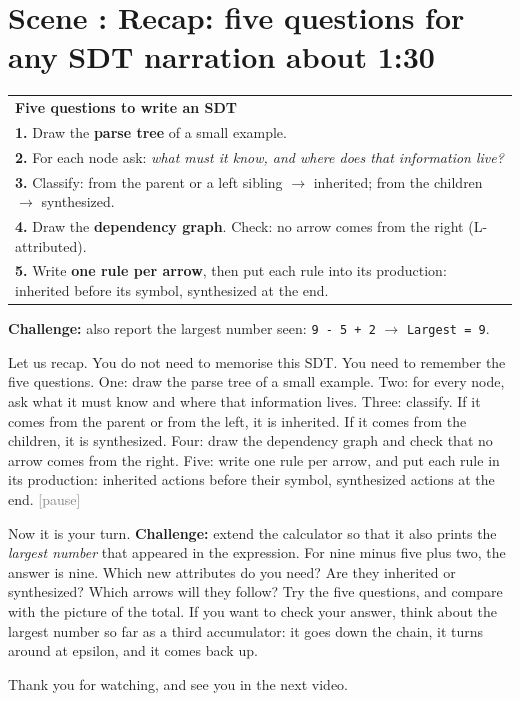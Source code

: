 \documentclass[11pt,a4paper]{article}
\newcommand{\inh}[1]{\textcolor{blue!70!black}{#1}}   %
\newcommand{\syn}[1]{\textcolor{red!70!black}{#1}}    %
\newcommand{\pause}{\textcolor{gray}{\textsf{[pause]}}}
\newcounter{scene}
\newcommand{\scene}[2]{\stepcounter{scene}\needspace{20\baselineskip}\section*{Scene \thescene: #1 \hfill {\normalfont\small #2}}}
\begin{document}
\scene{Recap: five questions for any SDT}{narration about 1:30}

\begin{onscreen}
\begin{center}
\begin{tabular}{|p{12.8cm}|}
\hline
\textbf{Five questions to write an SDT}\\[2pt]
\textbf{1.} Draw the \textbf{parse tree} of a small example.\\
\textbf{2.} For each node ask: \emph{what must it know, and where does that information live?}\\
\textbf{3.} Classify: from the parent or a left sibling $\to$ \inh{inherited}; from the children $\to$ \syn{synthesized}.\\
\textbf{4.} Draw the \textbf{dependency graph}. Check: no arrow comes from the right (L-attributed).\\
\textbf{5.} Write \textbf{one rule per arrow}, then put each rule into its production: \inh{inherited} before its symbol, \syn{synthesized} at the end.\\ \hline
\end{tabular}
\end{center}
\textbf{Challenge:} also report the largest number seen: \texttt{9 - 5 + 2} $\to$ \texttt{Largest = 9}.
\end{onscreen}

\begin{narration}
Let us recap. You do not need to memorise this SDT. You need to remember the five questions. One: draw the parse tree of a small example. Two: for every node, ask what it must know and where that information lives. Three: classify. If it comes from the parent or from the left, it is inherited. If it comes from the children, it is synthesized. Four: draw the dependency graph and check that no arrow comes from the right. Five: write one rule per arrow, and put each rule in its production: inherited actions before their symbol, synthesized actions at the end. \pause

Now it is your turn. \textbf{Challenge:} extend the calculator so that it also prints the \emph{largest number} that appeared in the expression. For nine minus five plus two, the answer is nine. Which new attributes do you need? Are they inherited or synthesized? Which arrows will they follow? Try the five questions, and compare with the picture of the total. If you want to check your answer, think about the largest number so far as a third accumulator: it goes down the chain, it turns around at epsilon, and it comes back up.

Thank you for watching, and see you in the next video.
\end{narration}
\end{document}
